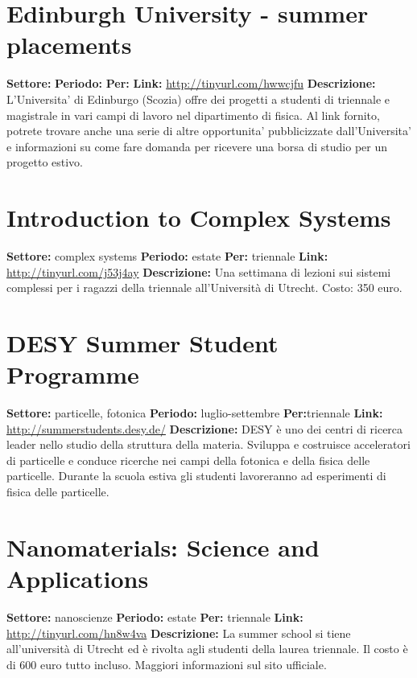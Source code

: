 \documentclass[a4paper,10pt]{article}
\begin{document}
\section{Edinburgh University - summer placements}
\textbf{Settore:} \newline
\textbf{Periodo:} \newline
\textbf{Per:}\newline
\textbf{Link:} \url{http://tinyurl.com/hwwcjfu} \newline
\textbf{Descrizione:}  L'Universita' di Edinburgo (Scozia) offre dei progetti a studenti di triennale e magistrale in vari campi di lavoro nel dipartimento di fisica. Al link fornito, potrete trovare anche una serie di altre opportunita' pubblicizzate dall'Universita' e informazioni su come fare domanda per ricevere una borsa di studio per un progetto estivo.   

\section{Introduction to Complex Systems}
\textbf{Settore:} complex systems\newline
\textbf{Periodo:} estate\newline
\textbf{Per:} triennale\newline
\textbf{Link:} \url{http://tinyurl.com/j53j4ay} \newline
\textbf{Descrizione:} Una settimana di lezioni sui sistemi complessi per i ragazzi della triennale all'Università di Utrecht. Costo: 350 euro.  

\section{DESY Summer Student Programme}
\textbf{Settore:} particelle, fotonica\newline
\textbf{Periodo:} luglio-settembre \newline
\textbf{Per:}triennale\newline
\textbf{Link:} \url{http://summerstudents.desy.de/} \newline
\textbf{Descrizione:}  DESY è uno dei centri di ricerca leader nello studio della struttura della materia. Sviluppa e costruisce acceleratori di particelle e conduce ricerche nei campi della fotonica e della fisica delle particelle. Durante la scuola estiva gli studenti lavoreranno ad esperimenti di fisica delle particelle.

\section{Nanomaterials: Science and Applications}
\textbf{Settore:} nanoscienze \newline
\textbf{Periodo:} estate \newline
\textbf{Per:} triennale\newline
\textbf{Link:} \url{http://tinyurl.com/hn8w4va} \newline
\textbf{Descrizione:} La summer school si tiene all'università di Utrecht ed è rivolta agli studenti della laurea triennale. Il costo è di 600 euro tutto incluso. Maggiori informazioni sul sito ufficiale.  
\end{document}
